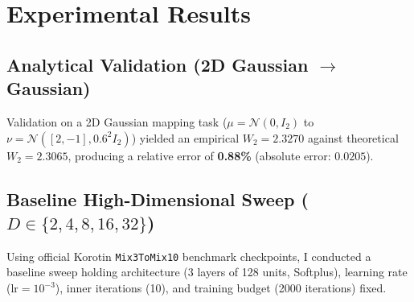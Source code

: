 \documentclass[11pt,a4paper]{article}
\begin{document}
\section{Experimental Results}

\subsection{Analytical Validation (2D Gaussian $\to$ Gaussian)}
Validation on a 2D Gaussian mapping task ($\mu = \mathcal{N}(0, I_2)$ to $\nu = \mathcal{N}([2, -1], 0.6^2 I_2)$) yielded an empirical $W_2 = 2.3270$ against theoretical $W_2 = 2.3065$, producing a relative error of \textbf{0.88\%} (absolute error: $0.0205$).

\subsection{Baseline High-Dimensional Sweep ($D \in \{2, 4, 8, 16, 32\}$)}

Using official Korotin \texttt{Mix3ToMix10} benchmark checkpoints, I conducted a baseline sweep holding architecture (3 layers of 128 units, Softplus), learning rate ($\text{lr}=10^{-3}$), inner iterations (10), and training budget (2000 iterations) fixed.

\begin{table}[h]
\centering
\caption{Consolidated Baseline High-Dimensional Sweep Telemetry}
\label{tab:high_d_results}
\end{table}
\end{document}
